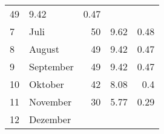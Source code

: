 \begin{longtable}{lXrrr}
       \num{49} &
       \num[round-mode=places,round-precision=2]{9,42} &
         \num[round-mode=places,round-precision=2]{0,47} \\

     7 &
     \multicolumn{1}{X}{ Juli   } &


       \num{50} &
       \num[round-mode=places,round-precision=2]{9,62} &
         \num[round-mode=places,round-precision=2]{0,48} \\

     8 &
     \multicolumn{1}{X}{ August   } &


       \num{49} &
       \num[round-mode=places,round-precision=2]{9,42} &
         \num[round-mode=places,round-precision=2]{0,47} \\

     9 &
     \multicolumn{1}{X}{ September   } &


       \num{49} &
       \num[round-mode=places,round-precision=2]{9,42} &
         \num[round-mode=places,round-precision=2]{0,47} \\

     10 &
     \multicolumn{1}{X}{ Oktober   } &


       \num{42} &
       \num[round-mode=places,round-precision=2]{8,08} &
         \num[round-mode=places,round-precision=2]{0,4} \\

     11 &
     \multicolumn{1}{X}{ November   } &


       \num{30} &
       \num[round-mode=places,round-precision=2]{5,77} &
         \num[round-mode=places,round-precision=2]{0,29} \\

     12 &
     \multicolumn{1}{X}{ Dezember   } &



\end{longtable}
